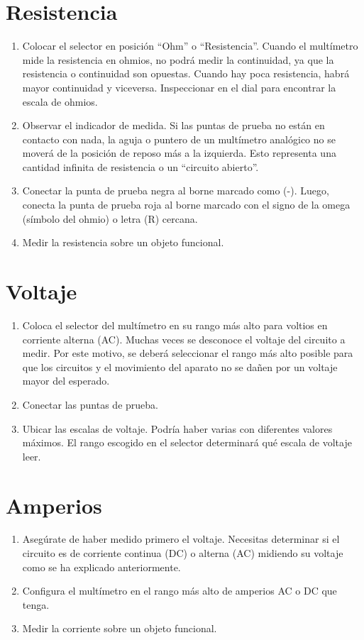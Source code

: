 \documentclass[a4paper,12pt]{report}
\begin{document}
\section{Resistencia}
\begin{enumerate}
\item Colocar el selector en posición “Ohm” o “Resistencia”. Cuando el multímetro mide la resistencia en ohmios, no podrá medir la continuidad, ya que la resistencia o continuidad son opuestas. Cuando hay poca resistencia, habrá mayor continuidad y viceversa. Inspeccionar en el dial para encontrar la escala de ohmios.
\item Observar el indicador de medida. Si las puntas de prueba no están en contacto con nada, la aguja o puntero de un multímetro analógico no se moverá de la posición de reposo más a la izquierda. Esto representa una cantidad infinita de resistencia o un “circuito abierto”.
\item Conectar la punta de prueba negra al borne marcado como (-). Luego, conecta la punta de prueba roja al borne marcado con el signo de la omega (símbolo del ohmio) o letra (R) cercana.
\item Medir la resistencia sobre un objeto funcional.
\end{enumerate}
\section{Voltaje}
\begin{enumerate}
\item Coloca el selector del multímetro en su rango más alto para voltios en corriente alterna (AC). Muchas veces se desconoce el voltaje del circuito a medir. Por este motivo, se deberá seleccionar el rango más alto posible para que los circuitos y el movimiento del aparato no se dañen por un voltaje mayor del esperado.
\item Conectar las puntas de prueba.
\item Ubicar las escalas de voltaje. Podría haber varias con diferentes valores máximos. El rango escogido en el selector determinará qué escala de voltaje leer.
\end{enumerate}
\section{Amperios}
\begin{enumerate}
\item Asegúrate de haber medido primero el voltaje. Necesitas determinar si el circuito es de corriente continua (DC) o alterna (AC) midiendo su voltaje como se ha explicado anteriormente.
\item Configura el multímetro en el rango más alto de amperios AC o DC que tenga.
\item  Medir la corriente sobre un objeto funcional.
\end{enumerate}
\newpage
\end{document}
